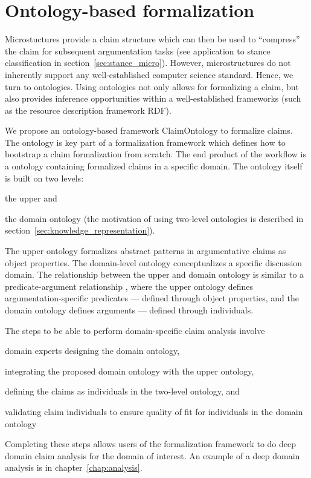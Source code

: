 \section{Ontology-based formalization}

Microstuctures provide a claim structure which can then be used 
to ``compress'' the claim for subsequent argumentation tasks
(see application to stance classification in section~\ref{sec:stance_micro}).
However, microstructures do not inherently support any
well-established computer science standard. 
Hence, we turn to ontologies. Using ontologies not only allows for 
formalizing a claim, but also provides inference opportunities within
a well-established frameworks (such as the resource description framework RDF). 

We propose an ontology-based framework ClaimOntology to  formalize claims. The
ontology is key part of a formalization framework which defines how to
bootstrap a claim formalization from scratch. The end product of the workflow
is a ontology containing formalized claims in a specific domain. 
The ontology itself is built on two levels: 
\begin{enumerate*}[label=(\arabic*)]
\item the upper and 
\item the domain ontology 
(the motivation of using two-level ontologies is described in
		section~\ref{sec:knowledge_representation}). 
\end{enumerate*}
The upper ontology formalizes abstract patterns in argumentative
claims as object properties. The domain-level ontology conceptualizes 
a specific discussion domain. The relationship between the upper 
and domain ontology is similar to a predicate-argument
relationship \citep{hindle1990noun}, where the upper ontology
defines argumentation-specific predicates --- defined through object properties, 
and the domain ontology defines arguments --- defined through 
individuals. 

The steps to be able to perform domain-specific claim analysis
involve
\begin{enumerate*}[label=(\arabic*)]
\item domain experts designing the domain ontology,
\item integrating the proposed domain ontology with the upper ontology,
\item defining the claims as individuals in the two-level ontology, and
\item validating claim individuals to ensure quality of fit for
	individuals in the domain ontology
\end{enumerate*}
Completing these steps allows users of the formalization framework
to do deep domain claim analysis for the domain of interest. 
An example of a deep domain analysis is in chapter~\ref{chap:analysis}.

